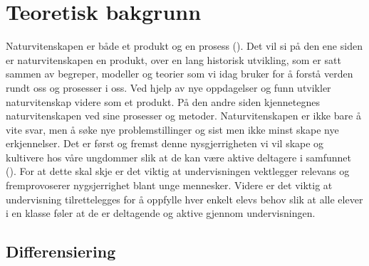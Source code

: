 \documentclass[main.tex]{subfiles}
\begin{document}
\section*{Teoretisk bakgrunn}

Naturvitenskapen er både et produkt og en prosess (). Det vil si på den ene siden er naturvitenskapen en produkt, over en lang historisk utvikling, som er satt sammen av begreper, modeller og teorier som vi idag bruker for å forstå verden rundt oss og prosesser i oss. Ved hjelp av nye oppdagelser og funn utvikler naturvitenskap videre som et produkt. På den andre siden kjennetegnes naturvitenskapen ved sine prosesser og metoder. Naturvitenskapen er ikke bare å vite svar, men å søke nye problemstillinger og sist men ikke minst skape nye erkjennelser. Det er først og fremst denne nysgjerrigheten vi vil skape og kultivere hos våre ungdommer slik at de kan være aktive deltagere i samfunnet (). For at dette skal skje er det viktig at undervisningen vektlegger relevans og fremprovoserer nygsjerrighet blant unge mennesker. Videre er det viktig at undervisning tilrettelegges for å oppfylle hver enkelt elevs behov slik at alle elever i en klasse føler at de er deltagende og aktive gjennom undervisningen.

\subsection*{Differensiering}
\end{document}
